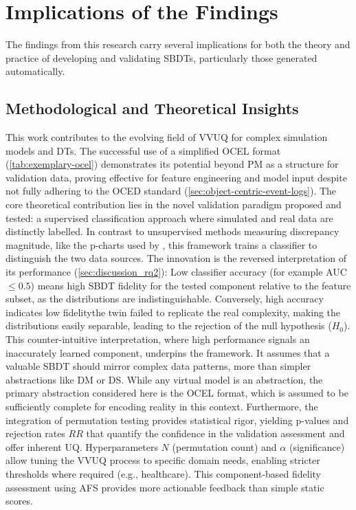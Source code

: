 \section{Implications of the Findings}
\label{sec:discussion_implications}

The findings from this research carry several implications for both the theory and practice of developing and validating SBDTs, particularly those generated automatically.

\subsection{Methodological and Theoretical Insights}
\label{sec:implications_theoretical}

This work contributes to the evolving field of VVUQ for complex simulation models and DTs. The successful use of a simplified OCEL format (\autoref{tab:exemplary-ocel}) demonstrates its potential beyond PM as a structure for validation data, proving effective for feature engineering and model input despite not fully adhering to the OCED standard (\autoref{sec:object-centric-event-logs}). The core theoretical contribution lies in the novel validation paradigm proposed and tested: a supervised classification approach where simulated and real data are distinctly labelled. In contrast to unsupervised methods measuring discrepancy magnitude, like the p-charts used by \textcite{dos2024simulation}, this framework trains a classifier to distinguish the two data sources. The innovation is the reversed interpretation of its performance (\autoref{sec:discussion_rq2}): Low classifier accuracy (for example AUC $\le 0.5$) means high SBDT fidelity for the tested component relative to the feature subset, as the distributions are indistinguishable. Conversely, high accuracy indicates low fidelity\textemdash the twin failed to replicate the real complexity, making the distributions easily separable, leading to the rejection of the null hypothesis ($H_0$). This counter-intuitive interpretation, where high performance signals an inaccurately learned component, underpins the framework. It assumes that a valuable SBDT should mirror complex data patterns, more than simpler abstractions like DM or DS. While any virtual model is an abstraction, the primary abstraction considered here is the OCEL format, which is assumed to be sufficiently complete for encoding reality in this context. Furthermore, the integration of permutation testing provides statistical rigor, yielding p-values and rejection rates $RR$ that quantify the confidence in the validation assessment and offer inherent UQ. Hyperparameters $N$ (permutation count) and $\alpha$ (significance) allow tuning the VVUQ process to specific domain needs, enabling stricter thresholds where required (e.g., healthcare). This component-based fidelity assessment using AFS provides more actionable feedback than simple static scores.

